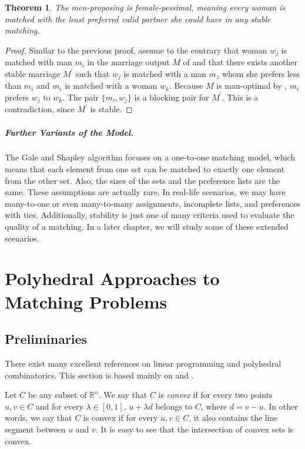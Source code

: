 \documentclass[12pt]{report}
\newtheorem{ttheorem}[base]{Theorem}
\numberwithin{algorithm}{chapter}
\begin{document}
	\begin{ttheorem}
		The men-proposing  is female-pessimal, meaning every woman is matched with the least preferred valid partner she could have in any stable matching.
	\end{ttheorem}
	\begin{proof}
		Similar to the previous proof, assume to the contrary that woman $w_{j}$ is matched with man $m_{i}$ in the marriage output $M$ of  and that there exists another stable marriage $M^{'}$ such that $w_{j}$ is matched with a man $m_{z}$ whom she prefers less than $m_{i}$ and $m_{i}$ is matched with a woman $w_{k}$. Because $M$ is man-optimal by , $m_{i}$ prefers $w_{j}$ to $w_{k}$. The pair $\{m_{i}, w_{j}\}$ is a blocking pair for $M^{'}$. This is a contradiction, since $M^{'}$ is stable.
	\end{proof}

	\paragraph{Further Variants of the Model.} The Gale and Shapley algorithm focuses on a one-to-one matching model, which means that each element from one set can be matched to exactly one element from the other set. Also, the sizes of the sets and the preference lists are the same. These assumptions are actually rare. In real-life scenarios, we may have many-to-one or even many-to-many assignments, incomplete lists, and preferences with ties. Additionally, stability is just one of many criteria used to evaluate the quality of a matching. In a later chapter, we will study some of these extended scenarios.


\chapter{Polyhedral Approaches to Matching Problems}

\section{Preliminaries}
	
	There exist many excellent references on linear programming and polyhedral combinatorics. This section is based mainly on \cite{matousek2007understanding} and \cite{schrijver2003volA}.
	
	Let $C$ be any subset of $\mathbb{R}^{n}$. We say that $C$ is \emph{convex} if for every two points $u, v \in C$ and for every $\lambda \in [0, 1]$, $u + \lambda d$ belongs to $C$, where $d = v - u$. In other words, we say that $C$ is convex if for every $u, v \in C$, it also contains the line segment between $u$ and $v$. It is easy to see that the intersection of convex sets is convex. 
	
\end{document}
